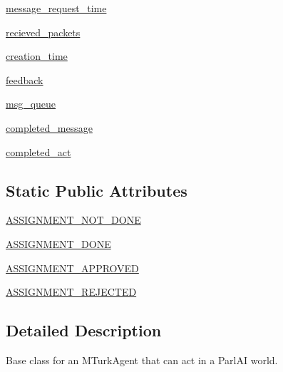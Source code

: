 \begin{DoxyCompactItemize}
\item 
\hyperlink{classparlai_1_1mturk_1_1core_1_1dev_1_1agents_1_1MTurkAgent_ab924c05dcc31a71c99b2e360dd8f4477}{message\+\_\+request\+\_\+time}
\item 
\hyperlink{classparlai_1_1mturk_1_1core_1_1dev_1_1agents_1_1MTurkAgent_a92f02000f55dc982d47299b41f630f18}{recieved\+\_\+packets}
\item 
\hyperlink{classparlai_1_1mturk_1_1core_1_1dev_1_1agents_1_1MTurkAgent_a4ccc514385183d4189d008dd3fe29dc3}{creation\+\_\+time}
\item 
\hyperlink{classparlai_1_1mturk_1_1core_1_1dev_1_1agents_1_1MTurkAgent_a2fe8f89ab693d56a6640138b4133132a}{feedback}
\item 
\hyperlink{classparlai_1_1mturk_1_1core_1_1dev_1_1agents_1_1MTurkAgent_a3bcf53409f598de0b9842df12f5b70f9}{msg\+\_\+queue}
\item 
\hyperlink{classparlai_1_1mturk_1_1core_1_1dev_1_1agents_1_1MTurkAgent_ad613c6468e4e8c6d3a5139628e28808b}{completed\+\_\+message}
\item 
\hyperlink{classparlai_1_1mturk_1_1core_1_1dev_1_1agents_1_1MTurkAgent_a7f552df348f725e022bc6d5ece942d49}{completed\+\_\+act}
\end{DoxyCompactItemize}
\subsection*{Static Public Attributes}
\begin{DoxyCompactItemize}
\item 
\hyperlink{classparlai_1_1mturk_1_1core_1_1dev_1_1agents_1_1MTurkAgent_a1db242824a1b3a1783cd6d83e04dd418}{A\+S\+S\+I\+G\+N\+M\+E\+N\+T\+\_\+\+N\+O\+T\+\_\+\+D\+O\+NE}
\item 
\hyperlink{classparlai_1_1mturk_1_1core_1_1dev_1_1agents_1_1MTurkAgent_ad19a5d2ab835a9e3670ea981f14ab2b7}{A\+S\+S\+I\+G\+N\+M\+E\+N\+T\+\_\+\+D\+O\+NE}
\item 
\hyperlink{classparlai_1_1mturk_1_1core_1_1dev_1_1agents_1_1MTurkAgent_ae49017b77979eb6f71db8e1f24cc5bc9}{A\+S\+S\+I\+G\+N\+M\+E\+N\+T\+\_\+\+A\+P\+P\+R\+O\+V\+ED}
\item 
\hyperlink{classparlai_1_1mturk_1_1core_1_1dev_1_1agents_1_1MTurkAgent_a70e6fe448de441fd081421546888b623}{A\+S\+S\+I\+G\+N\+M\+E\+N\+T\+\_\+\+R\+E\+J\+E\+C\+T\+ED}
\end{DoxyCompactItemize}


\subsection{Detailed Description}
\begin{DoxyVerb}Base class for an MTurkAgent that can act in a ParlAI world.
\end{DoxyVerb}
 

